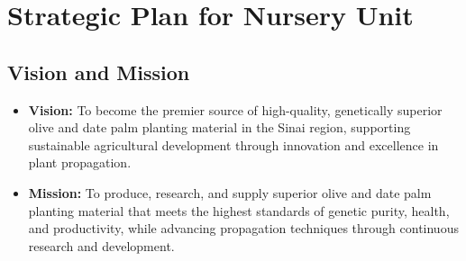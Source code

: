 \section{Strategic Plan for Nursery Unit}

\subsection{Vision and Mission}
\begin{itemize}
    \item \textbf{Vision:} To become the premier source of high-quality, genetically superior olive and date palm planting material in the Sinai region, supporting sustainable agricultural development through innovation and excellence in plant propagation.
    
    \item \textbf{Mission:} To produce, research, and supply superior olive and date palm planting material that meets the highest standards of genetic purity, health, and productivity, while advancing propagation techniques through continuous research and development.
\end{itemize}

